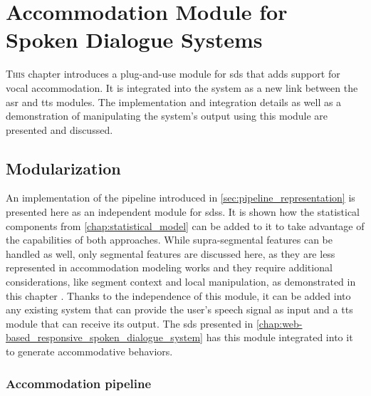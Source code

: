 \chapter[Accommodation Module for Spoken Dialogue Systems]{Accommodation Module for\\Spoken Dialogue Systems}
\label{chap:convergence_module_for_sdss}

\lettrine{T}{his} chapter introduces a plug-and-use module for \acs{sds} that adds support for vocal accommodation.
It is integrated into the system as a new link between the \acs{asr} and \acs{tts} modules.
The implementation and integration details as well as a demonstration of manipulating the system's output using this module are presented and discussed.

\pagebreak

\acresetall

\section{Modularization}
\label{sec:modularization}

An implementation of the pipeline introduced in \cref{sec:pipeline_representation} is presented here as an independent module for \acp{sds}.
It is shown how the statistical components from \cref{chap:statistical_model} can be added to it to take advantage of the capabilities of both approaches.
While supra-segmental features can be handled as well, only segmental features are discussed here, as they are less represented in accommodation modeling works and they require additional considerations, like segment context and local manipulation, as demonstrated in this chapter \citep[as explained in][]{Raveh2017SemDial}.
Thanks to the independence of this module, it can be added into any existing system that can provide the user's speech signal as input and a \ac{tts} module that can receive its output.
The \ac{sds} presented in \cref{chap:web-based_responsive_spoken_dialogue_system} has this module integrated into it to generate accommodative behaviors.

\subsection{Accommodation pipeline}
\label{subsec:computational_model}

